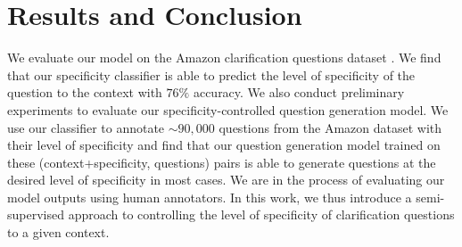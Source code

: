 \documentclass[11pt]{article}
\begin{document}
\section{Results and Conclusion}
We evaluate our model on the Amazon clarification questions dataset \cite{rao2019answer}. We find that our specificity classifier is able to predict the level of specificity of the question to the context with $76 \%$ accuracy. 
We also conduct preliminary experiments to evaluate our specificity-controlled question generation model. We use our classifier to annotate $\sim90,000$ questions from the Amazon dataset with their level of specificity and find that our question generation model trained on these (context+specificity, questions) pairs is able to generate questions at the desired level of specificity in most cases. We are in the process of evaluating our model outputs using human annotators. In this work, we thus introduce a semi-supervised approach to controlling the level of specificity of clarification questions to a given context.

%
%



\end{document}
